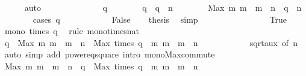 \begin{isabellebody}
\ \ \ \ \isamarkupfalse%
\ auto\isanewline
\ \ \ \ \isamarkupfalse%
\ {\isacharminus}\isanewline
\ \ \ \ \ \ \isamarkupfalse%
\ q\isanewline
\ \ \ \ \ \ \isamarkupfalse%
\ {\isachardoublequoteopen}q\ {\isacharasterisk}\ q\ {\isasymle}\ n{\isachardoublequoteclose}\isanewline
\ \ \ \ \ \ \isamarkupfalse%
\ {\isachardoublequoteopen}Max\ {\isacharbraceleft}m{\isachardot}\ m\ {\isacharasterisk}\ m\ {\isasymle}\ n{\isacharbraceright}\ {\isacharasterisk}\ q\ {\isasymle}\ n{\isachardoublequoteclose}\isanewline
\ \ \ \ \ \ \isamarkupfalse%
\ {\isacharparenleft}cases\ {\isachardoublequoteopen}q\ {\isachargreater}\ {}{\isachardoublequoteclose}{\isacharparenright}\isanewline
\ \ \ \ \ \ \ \ \isamarkupfalse%
\ False\ \isamarkupfalse%
\ \isamarkupfalse%
\ {\isacharquery}thesis\ \isamarkupfalse%
\ simp\isanewline
\ \ \ \ \ \ \isamarkupfalse%
\isanewline
\ \ \ \ \ \ \ \ \isamarkupfalse%
\ True\ \isamarkupfalse%
\ \isamarkupfalse%
\ {\isachardoublequoteopen}mono\ {\isacharparenleft}times\ q{\isacharparenright}{\isachardoublequoteclose}\ \isamarkupfalse%
\ {\isacharparenleft}rule\ mono{\isacharunderscore}times{\isacharunderscore}nat{\isacharparenright}\isanewline
\ \ \ \ \ \ \ \ \isamarkupfalse%
\ \isamarkupfalse%
\ {\isachardoublequoteopen}q\ {\isacharasterisk}\ Max\ {\isacharbraceleft}m{\isachardot}\ m\ {\isacharasterisk}\ m\ {\isasymle}\ n{\isacharbraceright}\ {\isacharequal}\ Max\ {\isacharparenleft}times\ q\ {\isacharbackquote}\ {\isacharbraceleft}m{\isachardot}\ m\ {\isacharasterisk}\ m\ {\isasymle}\ n{\isacharbraceright}{\isacharparenright}{\isachardoublequoteclose}\isanewline
\ \ \ \ \ \ \ \ \ \ \isamarkupfalse%
\ sqrt{\isacharunderscore}aux\ {\isacharbrackleft}of\ n{\isacharbrackright}\ \isamarkupfalse%
\ {\isacharparenleft}auto\ simp\ add{\isacharcolon}\ power{}{\isacharunderscore}eq{\isacharunderscore}square\ intro{\isacharcolon}\ mono{\isacharunderscore}Max{\isacharunderscore}commute{\isacharparenright}\isanewline
\ \ \ \ \ \ \ \ \isamarkupfalse%
\ \isamarkupfalse%
\ {\isachardoublequoteopen}Max\ {\isacharbraceleft}m{\isachardot}\ m\ {\isacharasterisk}\ m\ {\isasymle}\ n{\isacharbraceright}\ {\isacharasterisk}\ q\ {\isacharequal}\ Max\ {\isacharparenleft}times\ q\ {\isacharbackquote}\ {\isacharbraceleft}m{\isachardot}\ m\ {\isacharasterisk}\ m\ {\isasymle}\ n{\isacharbraceright}{\isacharparenright}{\isachardoublequoteclose}\ \isamarkupfalse%

\end{isabellebody}
